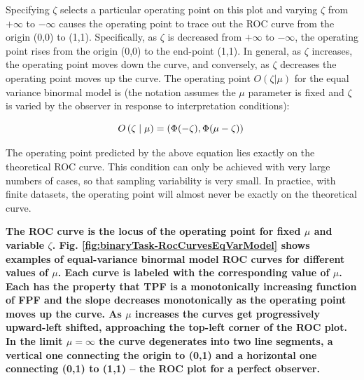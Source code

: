 \documentclass[
]{book}
\begin{document}
Specifying \(\zeta\) selects a particular operating point on this plot and varying \(\zeta\) from \(+\infty\) to \(-\infty\) causes the operating point to trace out the ROC curve from the origin (0,0) to (1,1). Specifically, as \(\zeta\) is decreased from \(+\infty\) to \(-\infty\), the operating point rises from the origin (0,0) to the end-point (1,1). In general, as \(\zeta\) increases, the operating point moves down the curve, and conversely, as \(\zeta\) decreases the operating point moves up the curve. The operating point \(O(\zeta|\mu)\) for the equal variance binormal model is (the notation assumes the \(\mu\) parameter is fixed and \(\zeta\) is varied by the observer in response to interpretation conditions):

\begin{equation} 
O\left ( \zeta \mid \mu \right ) = \left ( \Phi(-\zeta), \Phi(\mu-\zeta) \right ) \\
\label{eq:binaryTask-OpPt}
\end{equation}

The operating point predicted by the above equation lies exactly on the theoretical ROC curve. This condition can only be achieved with very large numbers of cases, so that sampling variability is very small. In practice, with finite datasets, the operating point will almost never be exactly on the theoretical curve.

\textbf{The ROC curve is the locus of the operating point for fixed \(\mu\) and variable \(\zeta\). Fig. \ref{fig:binaryTask-RocCurvesEqVarModel} shows examples of equal-variance binormal model ROC curves for different values of \(\mu\). Each curve is labeled with the corresponding value of \(\mu\). Each has the property that TPF is a monotonically increasing function of FPF and the slope decreases monotonically as the operating point moves up the curve. As \(\mu\) increases the curves get progressively upward-left shifted, approaching the top-left corner of the ROC plot. In the limit \(\mu = \infty\) the curve degenerates into two line segments, a vertical one connecting the origin to (0,1) and a horizontal one connecting (0,1) to (1,1) -- the ROC plot for a perfect observer.}
\end{document}

